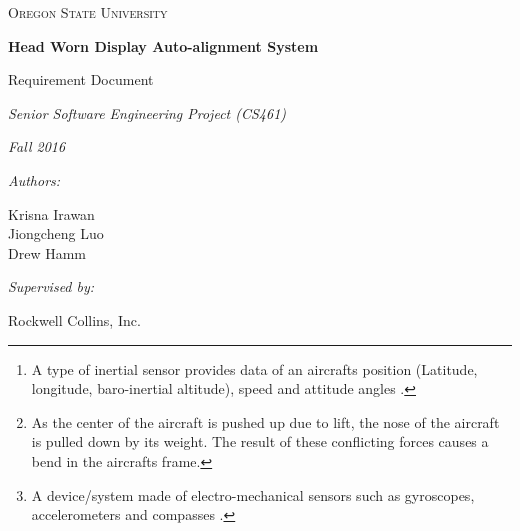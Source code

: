 \documentclass[letterpaper,10pt,notitlepage]{article}
\def\name{Krisna Irawan\\ Jiongcheng Luo\\ Drew Hamm}
\begin{document}
\begin{titlepage}
	\centering
	{\scshape\LARGE Oregon State University\par}
	\vspace{2cm}
	{\huge\bfseries Head Worn Display Auto-alignment System\par}
	\vspace{1cm}
	{\huge Requirement Document\par}
	\vspace{2cm}
	{\Large\itshape Senior Software Engineering Project (CS461)\par}
	{\Large\itshape Fall 2016\par}
	\vspace{1cm}
	{\normalsize\itshape Authors:\par}
	{\normalsize \name\par}
	\vspace{1cm}
	{\normalsize\itshape Supervised by:\par}
	{\normalsize Rockwell Collins, Inc.\par}
	\vspace{3cm}

	\begin{abstract}
	A Head-up Display (HUD), is a transparent display that presents all necessary data that pilots need in their flight environment. Currently, the HUD obtains data from an aircraft\textquotesingle s mounted device called inertial reference unit (IRU)\footnote{A type of inertial sensor provides data of an aircraft\textquotesingle s position (Latitude, longitude, baro-inertial altitude), speed and attitude angles \cite{iru}.}, this IRU outputs precise and aligned data to the HUD. However, the current alignment process requires specialized equipment and epoxy which is time consuming, costly, and interrupts production line progress for the original equipment manufacturer. In addition, the resulting HUD alignment, while precise, does not compensate for airframe droop\footnote{As the center of the aircraft is pushed up due to lift, the nose of the aircraft is pulled down by its weight. The result of these conflicting forces causes a bend in the aircraft\textquotesingle s frame. } during flight. Rockwell Collins looks forward to a new alignment methodology utilizing an inexpensive microelectromechanical systems (MEMS)\footnote{A device/system made of electro-mechanical sensors such as gyroscopes, accelerometers and compasses \cite{mems}.} IRU mounted onto the HUD to infer alignment data from the aircraft\textquotesingle s precisely mounted and aligned IRU. This project works on a solution that utilizes the data from both the inexpensive MEMS IRU and the aircraft mounted IRU to develop an algorithm, which aims to output precise and aligned data with reduced installation cost.
\end{abstract}
\end{titlepage}
\tableofcontents
\end{document}
